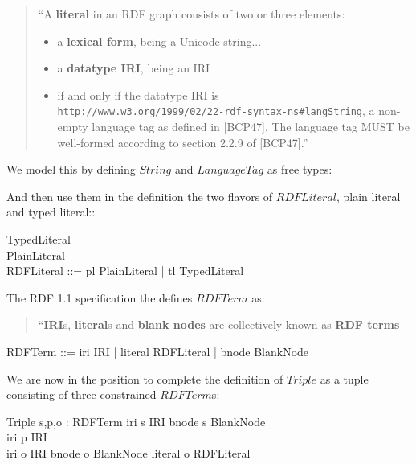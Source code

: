 \documentclass[fuzz]{llncs}
\def\entryFor{\cdot}
\begin{document}
\begin{quote}
``A \textbf{literal} in an RDF graph consists of two or three elements:
\begin{itemize}
\item a \textbf{lexical form}, being a Unicode string...
\item a \textbf{datatype IRI}, being an IRI
\item if and only if the datatype IRI is \\
\verb|http://www.w3.org/1999/02/22-rdf-syntax-ns#langString|, a non-empty language tag as defined in [BCP47]\cite{BCP47}. The language tag MUST be well-formed according to section 2.2.9 of [BCP47]\cite{BCP47}.''
\end{itemize}
\end{quote}
We model this by defining $String$ and $LanguageTag$ as free types:
\begin{zed}
\end{zed}
And then use them in the definition the two flavors of $RDFLiteral$,  plain literal and typed literal::
\begin{zed}
TypedLiteral  \\
PlainLiteral  \\
RDFLiteral ::= pl \ldata PlainLiteral \rdata | tl \ldata TypedLiteral \rdata \\ 
\end{zed}
The RDF 1.1 specification the defines $RDFTerm$ as:
\begin{quote}
``\textbf{IRI}s, \textbf{literal}s and \textbf{blank nodes} are collectively known as \textbf{RDF terms}
\end{quote}

\begin{zed}
RDFTerm ::= iri \ldata IRI \rdata | literal \ldata RDFLiteral \rdata | bnode \ldata BlankNode \rdata
\end{zed}
We are now in the position to complete the definition of $Triple$ as a tuple consisting of three constrained $RDFTerm$s:
\begin{schema}{Triple}
   s,p,o : RDFTerm
\where
   iri \entryFor s \in IRI \lor bnode \entryFor s \in BlankNode \\
   iri \entryFor p \in IRI \\
   iri \entryFor o \in IRI \lor bnode \entryFor o \in BlankNode \lor literal \entryFor o \in RDFLiteral
\end{schema}
\end{document}
